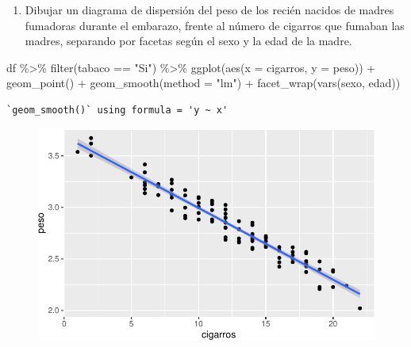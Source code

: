 \documentclass[
  a4paper,
]{scrreport}
\newenvironment{Shaded}{\begin{snugshade}}{\end{snugshade}}
\newcommand{\AttributeTok}[1]{\textcolor[rgb]{0.40,0.45,0.13}{#1}}
\newcommand{\FunctionTok}[1]{\textcolor[rgb]{0.28,0.35,0.67}{#1}}
\newcommand{\NormalTok}[1]{\textcolor[rgb]{0.00,0.23,0.31}{#1}}
\newcommand{\SpecialCharTok}[1]{\textcolor[rgb]{0.37,0.37,0.37}{#1}}
\newcommand{\StringTok}[1]{\textcolor[rgb]{0.13,0.47,0.30}{#1}}
\providecommand{\tightlist}{%
  \setlength{\itemsep}{0pt}\setlength{\parskip}{0pt}}\usepackage{longtable,booktabs,array}
\theoremstyle{definition}
\theoremstyle{definition}
\theoremstyle{remark}
\begin{document}
\begin{enumerate}
\def\labelenumi{\alph{enumi}.}
\setcounter{enumi}{7}
\tightlist
\item
  Dibujar un diagrama de dispersión del peso de los recién nacidos de
  madres fumadoras durante el embarazo, frente al número de cigarros que
  fumaban las madres, separando por facetas según el sexo y la edad de
  la madre.
\end{enumerate}

\begin{tcolorbox}[enhanced jigsaw, opacitybacktitle=0.6, leftrule=.75mm, title=\textcolor{quarto-callout-note-color}{\faInfo}\hspace{0.5em}{Solución}, coltitle=black, rightrule=.15mm, colframe=quarto-callout-note-color-frame, left=2mm, opacityback=0, colbacktitle=quarto-callout-note-color!10!white, arc=.35mm, bottomtitle=1mm, toptitle=1mm, titlerule=0mm, breakable, bottomrule=.15mm, toprule=.15mm, colback=white]

\begin{Shaded}
\begin{Highlighting}[]
\NormalTok{df }\SpecialCharTok{\%\textgreater{}\%} 
    \FunctionTok{filter}\NormalTok{(tabaco }\SpecialCharTok{==} \StringTok{"Si"}\NormalTok{) }\SpecialCharTok{\%\textgreater{}\%}
    \FunctionTok{ggplot}\NormalTok{(}\FunctionTok{aes}\NormalTok{(}\AttributeTok{x =}\NormalTok{ cigarros, }\AttributeTok{y =}\NormalTok{ peso)) }\SpecialCharTok{+}
        \FunctionTok{geom\_point}\NormalTok{() }\SpecialCharTok{+}
        \FunctionTok{geom\_smooth}\NormalTok{(}\AttributeTok{method =} \StringTok{"lm"}\NormalTok{) }\SpecialCharTok{+}
        \FunctionTok{facet\_wrap}\NormalTok{(}\FunctionTok{vars}\NormalTok{(sexo, edad))}
\end{Highlighting}
\end{Shaded}

\begin{verbatim}
`geom_smooth()` using formula = 'y ~ x'
\end{verbatim}

\begin{figure}[H]

{\centering \includegraphics{./07-graficos_files/figure-pdf/unnamed-chunk-40-1.pdf}

}

\end{figure}

\end{tcolorbox}
\end{document}
